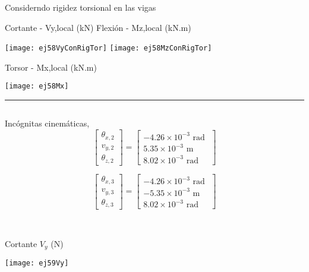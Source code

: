 Considerndo rigidez torsional en las vigas


\noindent
Cortante - Vy,local (kN)
\hfill
Flexión - Mz,local (kN.m)


\texttt{[image: ej58VyConRigTor]}
\texttt{[image: ej58MzConRigTor]}

\begin{center}
	
	Torsor - Mx,local (kN.m)
	
	\texttt{[image: ej58Mx]}
	
\end{center}



\hrule

\subsection{}

\vspace{5mm}


\begin{minipage}{0.45\textwidth}
	Incógnitas cinemáticas,
	$$
	\left[
	\begin{matrix}
	\theta_{x,2} \\
	v_{y,2} \\
	\theta_{z,2}
	\end{matrix}
	\right]
	=
	\left[
	\begin{matrix}
	-4.26\times 10^{-3} \text{ rad }\\
	 5.35\times 10^{-3} \text{ m }\\
	8.02\times 10^{-3} \text{ rad }
	\end{matrix}
	\right]
	$$
	
	$$
	\left[
	\begin{matrix}
	\theta_{x,3} \\
	v_{y,3} \\
	\theta_{z,3}
	\end{matrix}
	\right]
	=
	\left[
	\begin{matrix}
	-4.26\times 10^{-3} \text{ rad }\\
	-5.35\times 10^{-3} \text{ m }\\
	 8.02\times 10^{-3} \text{ rad }
	\end{matrix}
	\right]
	$$
\end{minipage}
~
\begin{minipage}{0.45\textwidth}
	Cortante $V_y$ (N)
	
	\texttt{[image: ej59Vy]}
\end{minipage}


